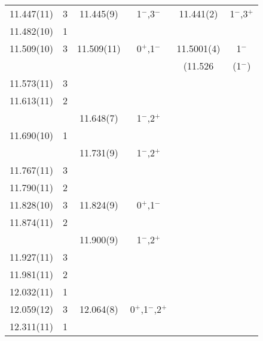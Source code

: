 \begin{center}
\begin{longtable}{cc cc cc}
    11.447(11)    & 3 &  11.445(9)  &  1$^-$,3$^-$        & 11.441(2)   &  1$^-$,3$^+$    \\
    11.482(10)    & 1 &   &   &   &   \\
    11.509(10)    & 3 &  11.509(11) &  0$^+$,1$^-$        & 11.5001(4)  &  1$^-$          \\
  &   &             &                     & (11.526 &  (1$^-$)        \\
     11.573(11)   & 3 &   &   &   &   \\
     11.613(11)   & 2 &   &   &   &   \\
  &   &  11.648(7)  & 1$^-$,2$^+$         &   &   \\
   11.690(10)     & 1 &   &   &   &   \\
  &   &  11.731(9)  & 1$^-$,2$^+$         &   &   \\
   11.767(11)     & 3 &   &   &   &   \\
   11.790(11)     & 2 &   &   &   &   \\
   11.828(10)     & 3 &  11.824(9)  & 0$^+$,1$^-$         &   &   \\
     11.874(11)   & 2 &   &   &   &   \\
  &   &  11.900(9)  & 1$^-$,2$^+$         &   &   \\
    11.927(11)    & 3 &   &   &   &   \\
    11.981(11)    & 2 &   &   &   &   \\
     12.032(11)   & 1 &   &   &   &   \\
     12.059(12)   & 3 &  12.064(8)  & 0$^+$,1$^-$,2$^+$   &   &   \\
    12.311(11)    & 1 &   &   &   &   \\


    \end{longtable}
\end{center}




